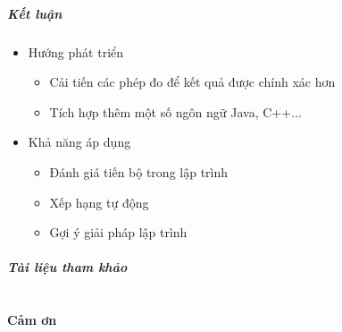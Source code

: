 \documentclass{beamer}
\begin{document}
\begin{frame}
  \frametitle{Kết luận}
  \begin{itemize}
  	\item Hướng phát triển
  	\begin{itemize}
  		\item Cải tiến các phép đo để kết quả được chính xác hơn
  		\item Tích hợp thêm một số ngôn ngữ Java, C++...
  	\end{itemize}
  	\item Khả năng áp dụng
  	\begin{itemize}
  		\item Đánh giá tiến bộ trong lập trình
  		\item Xếp hạng tự động
  		\item Gợi ý giải pháp lập trình
  	\end{itemize}
  \end{itemize}
\end{frame}


\begin{frame}
  \frametitle{Tài liệu tham khảo}
  
  
\end{frame}


\part{}

\begin{frame}
  \begin{center}
    \begin{Huge}
      \textbf{Cảm ơn}
    \end{Huge}
\end{center}

\end{frame}

\end{document}
